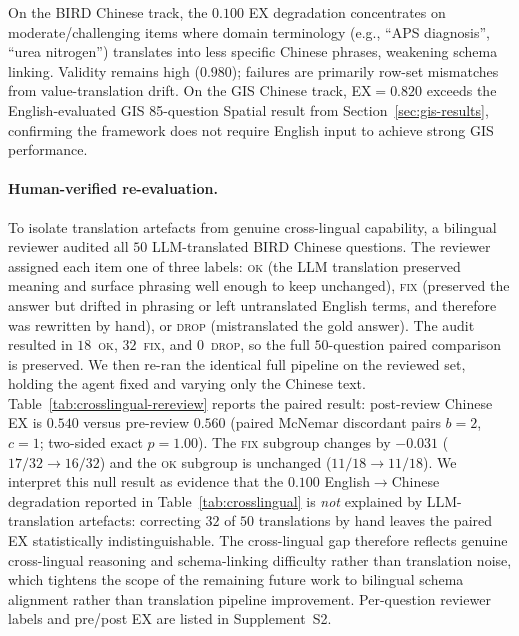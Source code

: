 \documentclass[11pt]{article}
\begin{document}
On the BIRD Chinese track, the $0.100$ EX degradation concentrates on moderate/challenging items where domain terminology (e.g., ``APS diagnosis'', ``urea nitrogen'') translates into less specific Chinese phrases, weakening schema linking. Validity remains high ($0.980$); failures are primarily row-set mismatches from value-translation drift. On the GIS Chinese track, EX$=0.820$ exceeds the English-evaluated GIS 85-question Spatial result from Section~\ref{sec:gis-results}, confirming the framework does not require English input to achieve strong GIS performance.

\paragraph{Human-verified re-evaluation.} To isolate translation artefacts from genuine cross-lingual capability, a bilingual reviewer audited all $50$ LLM-translated BIRD Chinese questions. The reviewer assigned each item one of three labels: \textsc{ok} (the LLM translation preserved meaning and surface phrasing well enough to keep unchanged), \textsc{fix} (preserved the answer but drifted in phrasing or left untranslated English terms, and therefore was rewritten by hand), or \textsc{drop} (mistranslated the gold answer). The audit resulted in $18$~\textsc{ok}, $32$~\textsc{fix}, and $0$~\textsc{drop}, so the full $50$-question paired comparison is preserved. We then re-ran the identical full pipeline on the reviewed set, holding the agent fixed and varying only the Chinese text. Table~\ref{tab:crosslingual-rereview} reports the paired result: post-review Chinese EX is $0.540$ versus pre-review $0.560$ (paired McNemar discordant pairs $b=2$, $c=1$; two-sided exact $p=1.00$). The \textsc{fix} subgroup changes by $-0.031$ ($17/32 \to 16/32$) and the \textsc{ok} subgroup is unchanged ($11/18 \to 11/18$). We interpret this null result as evidence that the $0.100$ English$\to$Chinese degradation reported in Table~\ref{tab:crosslingual} is \emph{not} explained by LLM-translation artefacts: correcting $32$ of $50$ translations by hand leaves the paired EX statistically indistinguishable. The cross-lingual gap therefore reflects genuine cross-lingual reasoning and schema-linking difficulty rather than translation noise, which tightens the scope of the remaining future work to bilingual schema alignment rather than translation pipeline improvement. Per-question reviewer labels and pre/post EX are listed in Supplement~S2.
\end{document}
